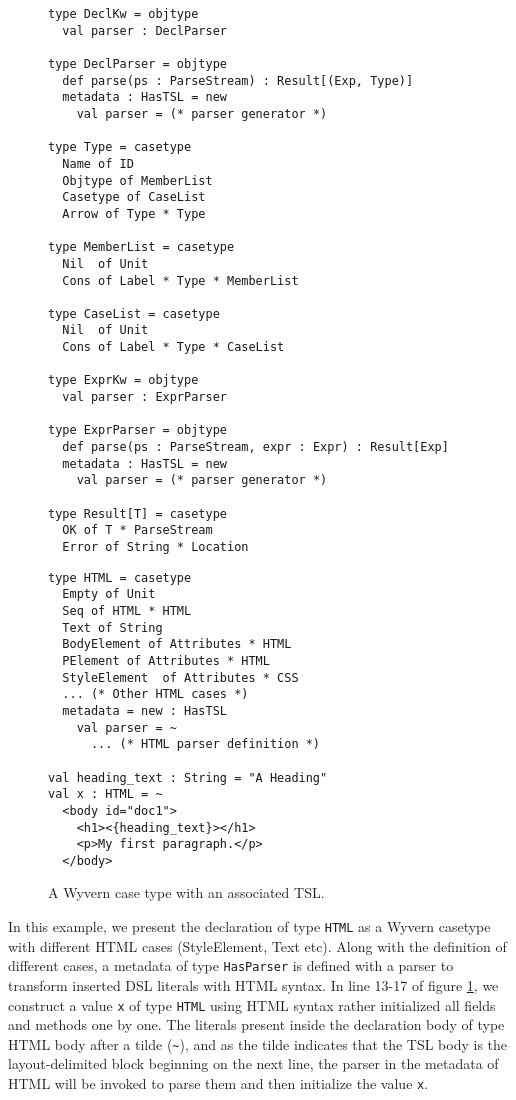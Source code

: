 \documentclass{sig-alternate}
\begin{document}
\begin{figure}[ht!]
\begin{lstlisting}[style=wyvern]
type DeclKw = objtype
  val parser : DeclParser

type DeclParser = objtype
  def parse(ps : ParseStream) : Result[(Exp, Type)]
  metadata : HasTSL = new 
    val parser = (* parser generator *)

type Type = casetype
  Name of ID
  Objtype of MemberList
  Casetype of CaseList
  Arrow of Type * Type

type MemberList = casetype
  Nil  of Unit
  Cons of Label * Type * MemberList

type CaseList = casetype
  Nil  of Unit
  Cons of Label * Type * CaseList

type ExprKw = objtype
  val parser : ExprParser

type ExprParser = objtype
  def parse(ps : ParseStream, expr : Expr) : Result[Exp]
  metadata : HasTSL = new 
    val parser = (* parser generator *)

type Result[T] = casetype
  OK of T * ParseStream
  Error of String * Location
\end{lstlisting}

\end{figure}

\begin{figure}[ht!]
\begin{lstlisting}[style=wyvern]
type HTML = casetype 
  Empty of Unit
  Seq of HTML * HTML 
  Text of String
  BodyElement of Attributes * HTML
  PElement of Attributes * HTML
  StyleElement  of Attributes * CSS
  ... (* Other HTML cases *)
  metadata = new : HasTSL
    val parser = ~
      ... (* HTML parser definition *)

val heading_text : String = "A Heading"
val x : HTML = ~
  <body id="doc1">
    <h1><{heading_text}></h1>
    <p>My first paragraph.</p>
  </body>
\end{lstlisting}
\vspace{-8px}
\caption{A Wyvern case type with an associated TSL. }
\vspace{-10px}
\label{f-htmltype}
\end{figure}

In this example, we present the declaration of type \verb|HTML| as a Wyvern casetype with different HTML cases (StyleElement, Text etc). Along with the definition of different cases, a metadata of type \verb|HasParser| is defined with a parser to transform inserted DSL literals with HTML syntax. In line 13-17 of figure \ref{f-htmltype}, we construct a value \verb|x| of type \verb|HTML| using HTML syntax rather initialized all fields and methods one by one. The literals present inside the declaration body of type HTML body after a tilde (\verb|~|), and as the tilde indicates that the TSL body is the layout-delimited block beginning on the next line, the parser in the metadata of HTML will be invoked to parse them and then initialize the value \verb|x|.
\end{document}
